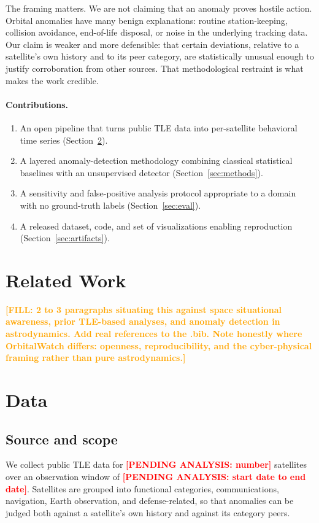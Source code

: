 \documentclass[11pt]{article}
\newcommand{\pending}[1]{\textcolor{red}{\textbf{[PENDING ANALYSIS: #1]}}}
\newcommand{\fill}[1]{\textcolor{orange}{\textbf{[FILL: #1]}}}
\begin{document}
The framing matters. We are not claiming that an anomaly proves hostile action.
Orbital anomalies have many benign explanations: routine station-keeping,
collision avoidance, end-of-life disposal, or noise in the underlying tracking
data. Our claim is weaker and more defensible: that certain deviations, relative
to a satellite's own history and to its peer category, are statistically unusual
enough to justify corroboration from other sources. That methodological
restraint is what makes the work credible.

\paragraph{Contributions.}
\begin{enumerate}[leftmargin=*]
  \item An open pipeline that turns public TLE data into per-satellite
        behavioral time series (Section~\ref{sec:data}).
  \item A layered anomaly-detection methodology combining classical statistical
        baselines with an unsupervised detector (Section~\ref{sec:methods}).
  \item A sensitivity and false-positive analysis protocol appropriate to a
        domain with no ground-truth labels (Section~\ref{sec:eval}).
  \item A released dataset, code, and set of visualizations enabling
        reproduction (Section~\ref{sec:artifacts}).
\end{enumerate}

\section{Related Work}
\fill{2 to 3 paragraphs situating this against space situational awareness,
prior TLE-based analyses, and anomaly detection in astrodynamics. Add real
references to the .bib. Note honestly where OrbitalWatch differs: openness,
reproducibility, and the cyber-physical framing rather than pure astrodynamics.}

\section{Data}
\label{sec:data}

\subsection{Source and scope}
We collect public TLE data for \pending{number} satellites over an observation
window of \pending{start date to end date}. Satellites are grouped into
functional categories, communications, navigation, Earth observation, and
defense-related, so that anomalies can be judged both against a satellite's own
history and against its category peers.
\end{document}
